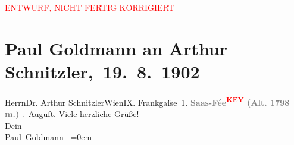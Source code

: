 
\begin{center}
            \textcolor{red}{ENTWURF, NICHT FERTIG KORRIGIERT}
                      \end{center}
            
         \renewcommand{\erwaehnteOrte}{Orte: Frankgasse, Saas-Fee, Wien}
         \renewcommand{\erwaehnteWerke}{}
               \section[ Paul Goldmann an Arthur Schnitzler, 19. 8. 1902]{ Paul Goldmann an Arthur Schnitzler, 19. 8. 1902}\nopagebreak{}\rehead{ }\begin{ledgroupsized}[t]{13cm}\normalsize\beginnumbering \toendnotes[C]{\smallbreak\pagebreak[2]} 
\pstart{}{\pb}Herrn\pend{}\pstart{}Dr. Arthur Schnitzler\pend{}\pstart{}Wien\pend{}\pstart{}IX. Frankgaſse 1.\pend{}{\bigskip}\pstart
           \noindent{}\centering{}{\pb}\textcolor{gray}{\textbf{\textbf{Saas-Fée}\textcolor{red}{\textsuperscript{\textbf{KEY}}} (Alt. 1798 m.)}}\pend
           . Auguſt.\pend
           \pstart
           Viele herzliche Grüße! {\\}Dein\pend
           \pstart
           {\\[\baselineskip]}\spacefill\mbox{Paul Goldmann }\pend
           \leftskip=0em{}
         
         \endnumbering{}\end{ledgroupsized}\begin{anhang}\end{anhang}\newcommand{\dateiname}{L03221}\newcommand{\titel}{Paul Goldmann an Arthur Schnitzler, 19. 8. 1902}\newcommand{\editorInnen}{Martin Anton Müller und Laura Untner}
      
